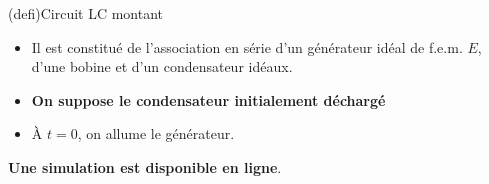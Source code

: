 \documentclass[../../main/main.tex]{subfiles}
\begin{document}
\begin{tcb*}[sidebyside, righthand ratio=.30](defi){Circuit LC montant}
  \begin{itemize}
    \item Il est constitué de l'association en série d'un générateur idéal de
      f.e.m. $E$, d'une bobine et d'un condensateur idéaux.
    \item \textbf{On suppose le condensateur initialement déchargé}
    \item À $t=0$, on allume le générateur.
  \end{itemize}
\textbf{Une simulation est disponible en
ligne}.
  \tcblower
  \begin{center}
  \end{center}
\end{tcb*}
\end{document}
